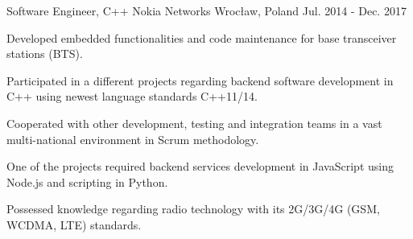 


\begin{cventries}

  \cventry
    {Software Engineer, C++}
    {Nokia Networks}
    {Wrocław, Poland}
    {Jul. 2014 - Dec. 2017}
    {
      \begin{cvitems}
        \item {Developed embedded functionalities and code maintenance for base transceiver stations (BTS).}
        \item {Participated in a different projects regarding backend software development in C++ using newest language standards C++11/14.}
        \item {Cooperated with other development, testing and integration teams in a vast multi-national environment in Scrum methodology.}
        \item {One of the projects required backend services development in JavaScript using Node.js and scripting in Python.}
        \item {Possessed knowledge regarding radio technology with its 2G/3G/4G (GSM, WCDMA, LTE) standards.}
      \end{cvitems}
    }
 
\end{cventries}
